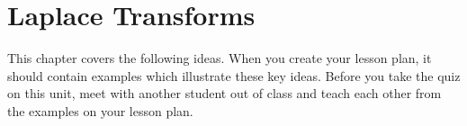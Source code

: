 
\chapter{Laplace Transforms}




This chapter covers the following ideas. When you create your lesson plan, it should contain examples which illustrate these key ideas. Before you take the quiz on this unit, meet with another student out of class and teach each other from the examples on your lesson plan. 




